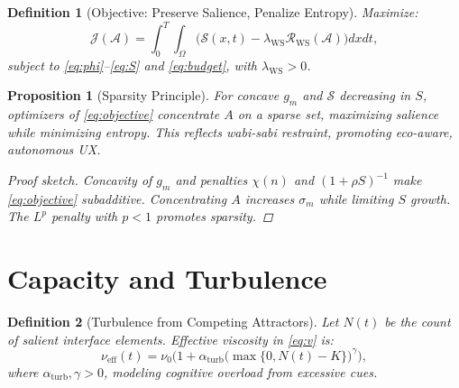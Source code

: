 \documentclass[openany]{book}
\newtheorem{definition}{Definition}[chapter]
\newtheorem{proposition}{Proposition}[chapter]
\newcommand{\Sent}{S} %
\begin{document}
\begin{definition}[Objective: Preserve Salience, Penalize Entropy]
\label{def:objective}
Maximize:
\begin{equation}
\label{eq:objective}
\mathcal{J}(\mathcal{A}) = \int_{0}^{T} \int_{\Omega} \Big(\mathcal{S}(x,t) - \lambda_{\mathrm{WS}} \mathcal{R}_{\mathrm{WS}}(\mathcal{A})\Big) dx dt,
\end{equation}
subject to \eqref{eq:phi}--\eqref{eq:S} and \eqref{eq:budget}, with $\lambda_{\mathrm{WS}} > 0$.
\end{definition}

\begin{proposition}[Sparsity Principle]
\label{prop:sparsity}
For concave $g_m$ and $\mathcal{S}$ decreasing in $\Sent$, optimizers of \eqref{eq:objective} concentrate $A$ on a sparse set, maximizing salience while minimizing entropy. This reflects wabi-sabi restraint, promoting eco-aware, autonomous UX.
\begin{proof}[Proof sketch]
Concavity of $g_m$ and penalties $\chi(n)$ and $(1 + \rho \Sent)^{-1}$ make \eqref{eq:objective} subadditive. Concentrating $A$ increases $\sigma_{m}$ while limiting $\Sent$ growth. The $L^p$ penalty with $p < 1$ promotes sparsity.
\end{proof}
\end{proposition}

\section{Capacity and Turbulence}
\label{sec:rsvp-turbulence}
\begin{definition}[Turbulence from Competing Attractors]
\label{def:turbulence}
Let $N(t)$ be the count of salient interface elements. Effective viscosity in \eqref{eq:v} is:
\begin{equation}
\label{eq:visc}
\nu_{\mathrm{eff}}(t) = \nu_0 \Big(1 + \alpha_{\mathrm{turb}} \big(\max\{0, N(t) - K\}\big)^\gamma \Big),
\end{equation}
where $\alpha_{\mathrm{turb}}, \gamma > 0$, modeling cognitive overload from excessive cues.
\end{definition}
\end{document}
